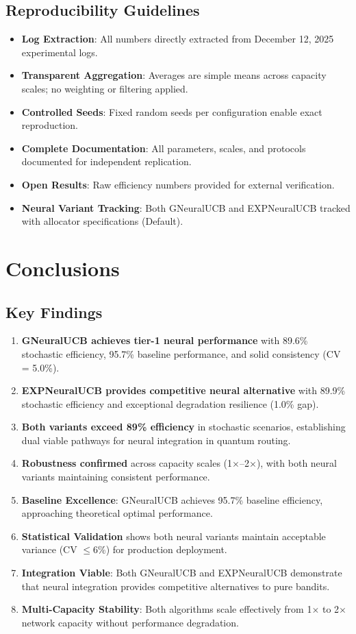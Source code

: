 \documentclass[12pt,a4paper]{article}
\newcommand{\success}[1]{\textcolor{accentgreen}{\textbf{#1}}}
\newcommand{\legacy}[1]{\textcolor{legacycolor}{\textbf{#1}}}
\newcommand{\neural}[1]{\textcolor{neuralcolor}{\textbf{#1}}}
\begin{document}
\subsection{Reproducibility Guidelines}
\begin{itemize}
\item \textbf{Log Extraction}: All numbers directly extracted from December 12, 2025 experimental logs.
\item \textbf{Transparent Aggregation}: Averages are simple means across capacity scales; no weighting or filtering applied.
\item \textbf{Controlled Seeds}: Fixed random seeds per configuration enable exact reproduction.
\item \textbf{Complete Documentation}: All parameters, scales, and protocols documented for independent replication.
\item \textbf{Open Results}: Raw efficiency numbers provided for external verification.
\item \textbf{Neural Variant Tracking}: Both GNeuralUCB and EXPNeuralUCB tracked with allocator specifications (Default).
\end{itemize}

\newpage
\section{Conclusions}

\subsection{Key Findings}
\begin{enumerate}
\item \neural{GNeuralUCB achieves tier-1 neural performance} with 89.6\% stochastic efficiency, 95.7\% baseline performance, and solid consistency (CV = 5.0\%).
\item \legacy{EXPNeuralUCB provides competitive neural alternative} with 89.9\% stochastic efficiency and exceptional degradation resilience (1.0\% gap).
\item \success{Both variants exceed 89\% efficiency} in stochastic scenarios, establishing dual viable pathways for neural integration in quantum routing.
\item \success{Robustness confirmed} across capacity scales (1$\times$--2$\times$), with both neural variants maintaining consistent performance.
\item \neural{Baseline Excellence}: GNeuralUCB achieves 95.7\% baseline efficiency, approaching theoretical optimal performance.
\item \success{Statistical Validation} shows both neural variants maintain acceptable variance (CV $\leq$6\%) for production deployment.
\item \neural{Integration Viable}: Both GNeuralUCB and EXPNeuralUCB demonstrate that neural integration provides competitive alternatives to pure bandits.
\item \success{Multi-Capacity Stability}: Both algorithms scale effectively from 1$\times$ to 2$\times$ network capacity without performance degradation.
\end{enumerate}
\end{document}
